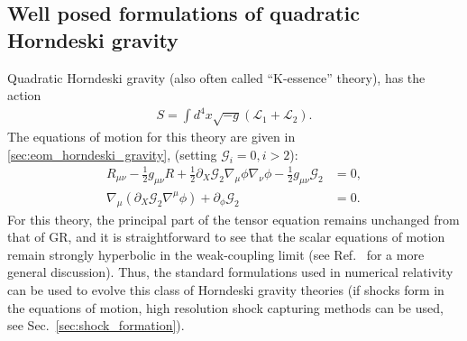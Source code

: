 \documentclass{ws-ijmpd}
\begin{document}
\subsection{Well posed formulations of quadratic Horndeski gravity
\label{sec:quadratic_horndeksi_gravity_well_posedness}
}
Quadratic Horndeski gravity
(also often called ``K-essence''
theory\cite{Armendariz-Picon:2000nqq,Armendariz-Picon:2000ulo}),
has the action
\begin{align}
   S=
   \int d^4x\sqrt{-g}\left(
      \mathcal{L}_1
      +
      \mathcal{L}_2
   \right)
   .
\end{align}
The equations of motion for this theory are given in
\ref{sec:eom_horndeski_gravity}, (setting $\mathcal{G}_i=0,i>2$):
\begin{align}
   R_{\mu\nu}
   -
   \frac{1}{2}g_{\mu\nu}R
   +
   \frac{1}{2}\partial_X\mathcal{G}_2
   \nabla_{\mu}\phi\nabla_{\nu}\phi
   -
   \frac{1}{2}g_{\mu\nu}\mathcal{G}_2
   &=
   0
   ,\\
   \nabla_{\mu}\left(\partial_X\mathcal{G}_2\nabla^{\mu}\phi\right)
   +
   \partial_{\phi}\mathcal{G}_2
   &=
   0
   .
\end{align}
For this theory,
the principal part of the tensor equation remains unchanged
from that of GR, and it is straightforward to see that the
scalar equations of motion remain strongly hyperbolic
in the weak-coupling limit (see Ref.~
for a more general discussion). Thus, the standard formulations used
in numerical relativity can be used to evolve this class
of Horndeski gravity theories (if shocks
form in the equations of motion, high resolution shock
capturing methods can be used\cite{Bezares:2021dma}, see
Sec.~\ref{sec:shock_formation}).
\end{document}

